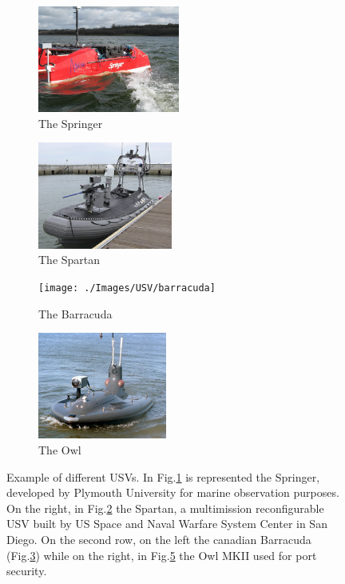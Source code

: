\documentclass[12pt]{article}
\begin{document}
      \begin{figure}
            \centering

            \begin{subfigure}[b]{.40\linewidth}
            \includegraphics[width=\linewidth, height= 3.5cm]{./Images/USV/springer}
            \caption{The Springer}\label{fig:springer}
            \end{subfigure}
            \begin{subfigure}[b]{.40\linewidth}
            \includegraphics[width=\linewidth, height= 3.5cm]{./Images/USV/spartan}
            \caption{The Spartan}\label{fig:spartan}
            \end{subfigure}

            \begin{subfigure}[b]{.40\linewidth}
            \texttt{[image: ./Images/USV/barracuda]}
            \caption{The Barracuda}\label{fig:barracuda}
            \end{subfigure}
            \begin{subfigure}[b]{.40\linewidth}
            \includegraphics[width=\linewidth, height= 3.5cm]{./Images/USV/owl_mk2}
            \caption{The Owl}\label{fig:owl}
            \end{subfigure}
            \caption{Example of different USVs. In Fig.\ref{fig:springer} is represented the Springer, developed by Plymouth University for marine observation purposes. On the right, in Fig.\ref{fig:spartan} the Spartan, a multi\-mission reconfigurable USV built by US Space and Naval Warfare System Center in San Diego. On the second row, on the left the canadian Barracuda (Fig.\ref{fig:barracuda}) while on the right, in Fig.\ref{fig:owl} the Owl MKII used for port security.}
      \end{figure}
\end{document}
